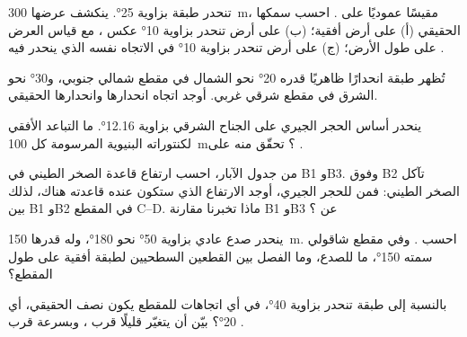 \begin{exercise}[$\star\star$]\label{exo:b1:cross-sections:5}
تنحدر طبقة بزاوية \ang{25}. ينكشف عرضها \qty{300}{m}، مقيسًا عموديًا على . احسب سمكها الحقيقي (أ) على أرض أفقية؛ (ب) على أرض تنحدر بزاوية \ang{10} عكس ، مع قياس العرض على طول الأرض؛ (ج) على أرض تنحدر بزاوية \ang{10} في الاتجاه نفسه الذي ينحدر فيه .
\end{exercise}

\begin{exercise}[$\star\star$]\label{exo:b1:cross-sections:6}
تُظهر طبقة انحدارًا ظاهريًا قدره \ang{20} نحو الشمال في مقطع شمالي جنوبي، و\ang{30} نحو الشرق في مقطع شرقي غربي. أوجد اتجاه انحدارها وانحدارها الحقيقي.
\end{exercise}

\begin{exercise}[$\star\star$]\label{exo:b1:cross-sections:7}
ينحدر أساس الحجر الجيري على الجناح الشرقي بزاوية \ang{12.16}. ما التباعد الأفقي لكنتوراته البنيوية المرسومة كل \qty{100}{m}؟ تحقّق منه على .
\end{exercise}

\begin{exercise}[$\star\star$]\label{exo:b1:cross-sections:8}
من جدول الآبار، احسب ارتفاع قاعدة الصخر الطيني في B1 وB3. وفوق B2 تآكل الصخر الطيني: فمن  للحجر الجيري، أوجد الارتفاع الذي ستكون عنده قاعدته هناك،  لذلك  بين B1 وB2 في المقطع C--D. ماذا تخبرنا مقارنة B1 وB3 عن ؟
\end{exercise}

\begin{exercise}[$\star\star$]\label{exo:b1:cross-sections:9}
ينحدر صدع عادي بزاوية \ang{50} نحو \ang{180}، وله  قدرها \qty{150}{m}. احسب . وفي مقطع شاقولي سمته \ang{150}، ما  للصدع، وما الفصل بين القطعين السطحيين لطبقة أفقية على طول المقطع؟
\end{exercise}

\begin{exercise}[$\star\star\star$]\label{exo:b1:cross-sections:10}
بالنسبة إلى طبقة تنحدر بزاوية \ang{40}، في أي اتجاهات للمقطع يكون  نصف  الحقيقي، أي \ang{20}؟ بيّن أن  يتغيّر قليلًا قرب ، وبسرعة قرب .
\end{exercise}

